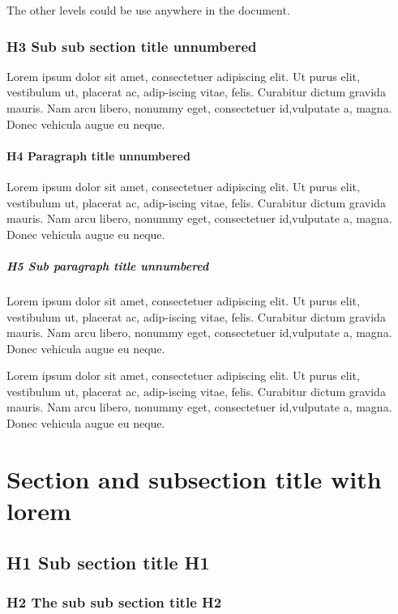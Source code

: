 \documentclass[Theme1]{{template_material/eurostat}}
\begin{document}
The other levels could be use anywhere in the document.

\subsubsection*{H3 Sub sub section title unnumbered}

Lorem ipsum dolor sit amet, consectetuer adipiscing elit. Ut purus elit, vestibulum ut, placerat ac, adip-iscing vitae, felis. Curabitur dictum gravida mauris. Nam arcu libero, nonummy eget, consectetuer id,vulputate a, magna. Donec vehicula augue eu neque.

\paragraph*{H4 Paragraph title unnumbered}
Lorem ipsum dolor sit amet, consectetuer adipiscing elit. Ut purus elit, vestibulum ut, placerat ac, adip-iscing vitae, felis. Curabitur dictum gravida mauris. Nam arcu libero, nonummy eget, consectetuer id,vulputate a, magna. Donec vehicula augue eu neque.

\subparagraph*{H5 Sub paragraph title unnumbered}
Lorem ipsum dolor sit amet, consectetuer adipiscing elit. Ut purus elit, vestibulum ut, placerat ac, adip-iscing vitae, felis. Curabitur dictum gravida mauris. Nam arcu libero, nonummy eget, consectetuer id,vulputate a, magna. Donec vehicula augue eu neque.

Lorem ipsum dolor sit amet, consectetuer adipiscing elit. Ut purus elit, vestibulum ut, placerat ac, adip-iscing vitae, felis. Curabitur dictum gravida mauris. Nam arcu libero, nonummy eget, consectetuer id,vulputate a, magna. Donec vehicula augue eu neque.

\newpage %

\section{Section and subsection title with lorem}



\subsection{H1 Sub section title H1}
\lipsum[1-1]
\subsubsection{H2 The sub sub section title H2}
\lipsum[1-1]
\end{document}
